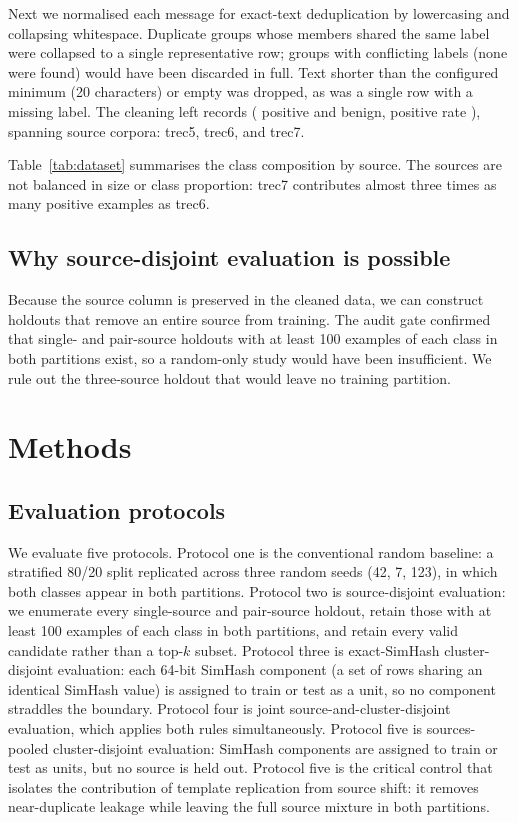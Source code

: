 \documentclass[conference]{IEEEtran}
\begin{document}
Next we normalised each message for exact-text deduplication by lowercasing and collapsing whitespace. Duplicate groups whose members shared the same label were collapsed to a single representative row; groups with conflicting labels (none were found) would have been discarded in full. Text shorter than the configured minimum (20 characters) or empty was dropped, as was a single row with a missing label. The cleaning left \NDocs{} records (\NPos{} positive and \NNeg{} benign, positive rate \PosRate), spanning \NSources{} source corpora: trec5, trec6, and trec7.

Table~\ref{tab:dataset} summarises the class composition by source. The sources are not balanced in size or class proportion: trec7 contributes almost three times as many positive examples as trec6.



\subsection{Why source-disjoint evaluation is possible}
Because the source column is preserved in the cleaned data, we can construct holdouts that remove an entire source from training. The audit gate confirmed that single- and pair-source holdouts with at least 100 examples of each class in both partitions exist, so a random-only study would have been insufficient. We rule out the three-source holdout that would leave no training partition.

\section{Methods}
\subsection{Evaluation protocols}
We evaluate five protocols. Protocol one is the conventional random baseline: a stratified 80/20 split replicated across three random seeds (42, 7, 123), in which both classes appear in both partitions. Protocol two is source-disjoint evaluation: we enumerate every single-source and pair-source holdout, retain those with at least 100 examples of each class in both partitions, and retain every valid candidate rather than a top-$k$ subset. Protocol three is exact-SimHash cluster-disjoint evaluation: each 64-bit SimHash component (a set of rows sharing an identical SimHash value) is assigned to train or test as a unit, so no component straddles the boundary. Protocol four is joint source-and-cluster-disjoint evaluation, which applies both rules simultaneously. Protocol five is sources-pooled cluster-disjoint evaluation: SimHash components are assigned to train or test as units, but no source is held out. Protocol five is the critical control that isolates the contribution of template replication from source shift: it removes near-duplicate leakage while leaving the full source mixture in both partitions.
\end{document}
